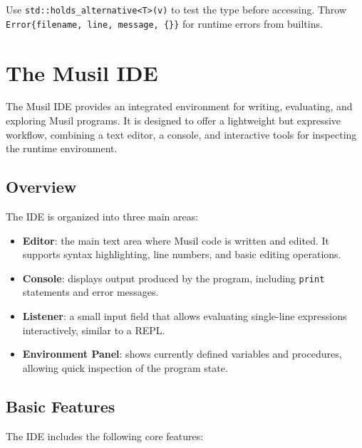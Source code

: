\documentclass[11pt,a4paper]{article}
\begin{document}
Use \texttt{std::holds\_alternative<T>(v)} to test the type before accessing.
Throw \texttt{Error\{filename, line, message, \{\}\}} for runtime errors from
builtins.

\section{The Musil IDE}

The Musil IDE provides an integrated environment for writing, evaluating, and exploring Musil programs. It is designed to offer a lightweight but expressive workflow, combining a text editor, a console, and interactive tools for inspecting the runtime environment.

\subsection{Overview}

The IDE is organized into three main areas:

\begin{itemize}
    \item \textbf{Editor}: the main text area where Musil code is written and edited. It supports syntax highlighting, line numbers, and basic editing operations.
    \item \textbf{Console}: displays output produced by the program, including \texttt{print} statements and error messages.
    \item \textbf{Listener}: a small input field that allows evaluating single-line expressions interactively, similar to a REPL.
    \item \textbf{Environment Panel}: shows currently defined variables and procedures, allowing quick inspection of the program state.
\end{itemize}

\subsection{Basic Features}

The IDE includes the following core features:
\end{document}
